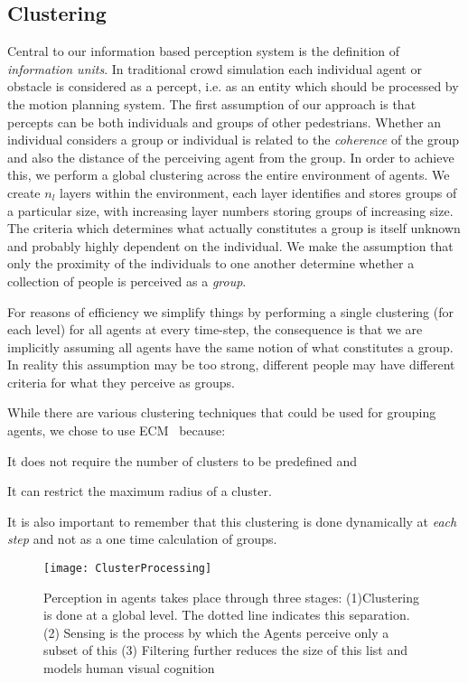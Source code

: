 \subsection{Clustering}
\label{IBP:Clustering}
Central to our information based perception system is the definition of \emph{information units}. In traditional crowd simulation each individual agent or obstacle is considered as a percept, i.e. as an entity which should be processed by the motion planning system. The first assumption of our approach is that percepts can be both individuals and groups of other pedestrians. Whether an individual considers a group or individual is related to the {\em coherence} of the group and also the distance of the perceiving agent from the group. In order to achieve this, we perform a global clustering across the entire environment of agents. We create $n_l$ layers within the environment, each layer identifies and stores groups of a particular size, with increasing layer numbers storing groups of increasing size. The criteria which determines what actually constitutes a group is itself unknown and probably highly dependent on the individual. We make the assumption that only the proximity of the individuals to one another determine whether a collection of people is perceived as a {\em group}. 

For reasons of efficiency we simplify things by performing a single clustering (for each level) for all agents at every time-step, the consequence is that we are implicitly assuming all agents have the same notion of what constitutes a group. In reality this assumption may be too strong, different people may have different criteria for what they perceive as groups. 

While there are various clustering techniques that could be used for grouping agents, we chose to use ECM~\cite{Song:2001vg} because: 
\begin{inparaenum} 
\item It does not require the number of clusters to be predefined and 
\item It can restrict the maximum radius of a cluster. 
\end{inparaenum}
It is also important to remember that this clustering is done dynamically at \emph{each step} and not as a one time calculation of groups.


\begin{figure}[!t]
\centering
\texttt{[image: ClusterProcessing]}
\caption[Breakdown of the Perception Process]{Perception in agents takes place through three stages: (1)Clustering is done at a global level. The dotted line indicates this separation. (2) Sensing is the process by which the Agents perceive only a subset of this (3) Filtering further reduces the size of this list and models human visual cognition}
\label{fig:AgentClusteredPerception}
\end{figure}

